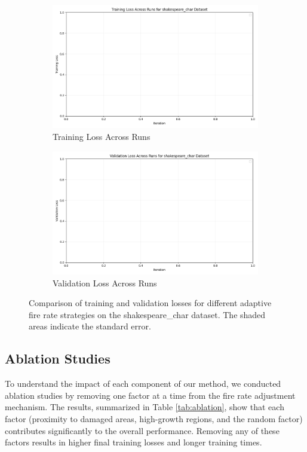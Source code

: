 \documentclass{article} %
\begin{document}
\begin{figure}[h]
    \centering
    \begin{subfigure}{0.49\textwidth}
        \includegraphics[width=\textwidth]{train_loss_shakespeare_char.png}
        \caption{Training Loss Across Runs}
        \label{fig:train-loss}
    \end{subfigure}
    \hfill
    \begin{subfigure}{0.49\textwidth}
        \includegraphics[width=\textwidth]{val_loss_shakespeare_char.png}
        \caption{Validation Loss Across Runs}
        \label{fig:val-loss}
    \end{subfigure}
    \caption{Comparison of training and validation losses for different adaptive fire rate strategies on the shakespeare\_char dataset. The shaded areas indicate the standard error.}
    \label{fig:comparison}
\end{figure}

\subsection{Ablation Studies}
To understand the impact of each component of our method, we conducted ablation studies by removing one factor at a time from the fire rate adjustment mechanism. The results, summarized in Table \ref{tab:ablation}, show that each factor (proximity to damaged areas, high-growth regions, and the random factor) contributes significantly to the overall performance. Removing any of these factors results in higher final training losses and longer training times.
\end{document}
